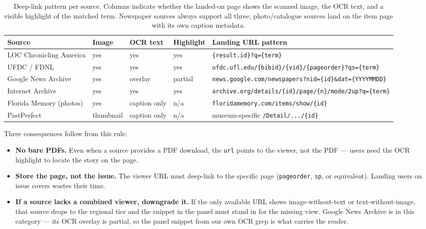 \documentclass[11pt,letterpaper]{article}
\begin{document}
\begin{table}[H]
\centering
\small
\begin{tabular}{@{}p{3.2cm}p{1.6cm}p{1.6cm}p{1.6cm}p{5.6cm}@{}}
\toprule
\textbf{Source} & \textbf{Image} & \textbf{OCR text} & \textbf{Highlight} & \textbf{Landing URL pattern} \\
\midrule
LOC Chronicling America & yes & yes & yes & \texttt{\{result.id\}?q=\{term\}} \\
UFDC / FDNL & yes & yes & yes & \texttt{ufdc.ufl.edu/\{bibid\}/\{vid\}/\{pageorder\}?qs=\{term\}} \\
Google News Archive & yes & overlay & partial & \texttt{news.google.com/newspapers?nid=\{id\}\&dat=\{YYYYMMDD\}} \\
Internet Archive & yes & yes & yes & \texttt{archive.org/details/\{id\}/page/\{n\}/mode/2up?q=\{term\}} \\
Florida Memory (photos) & yes & caption only & n/a & \texttt{floridamemory.com/items/show/\{id\}} \\
PastPerfect & thumbnail & caption only & n/a & museum-specific \texttt{/Detail/.../\{id\}} \\
\bottomrule
\end{tabular}
\caption{Deep-link pattern per source. Columns indicate whether the landed-on page shows the scanned image, the OCR text, and a visible highlight of the matched term. Newspaper sources always support all three; photo/catalogue sources land on the item page with its own caption metadata.}
\label{tab:viewers}
\end{table}

Three consequences follow from this rule:

\begin{itemize}[leftmargin=1.5em]
  \item \textbf{No bare PDFs.} Even when a source provides a PDF download, the \texttt{url} points to the viewer, not the PDF --- users need the OCR highlight to locate the story on the page.
  \item \textbf{Store the page, not the issue.} The viewer URL must deep-link to the specific page (\texttt{pageorder}, \texttt{sp}, or equivalent). Landing users on issue covers wastes their time.
  \item \textbf{If a source lacks a combined viewer, downgrade it.} If the only available URL shows image-without-text or text-without-image, that source drops to the regional tier and the snippet in the panel must stand in for the missing view. Google News Archive is in this category --- its OCR overlay is partial, so the panel snippet from our own OCR grep is what carries the reader.
\end{itemize}
\end{document}

